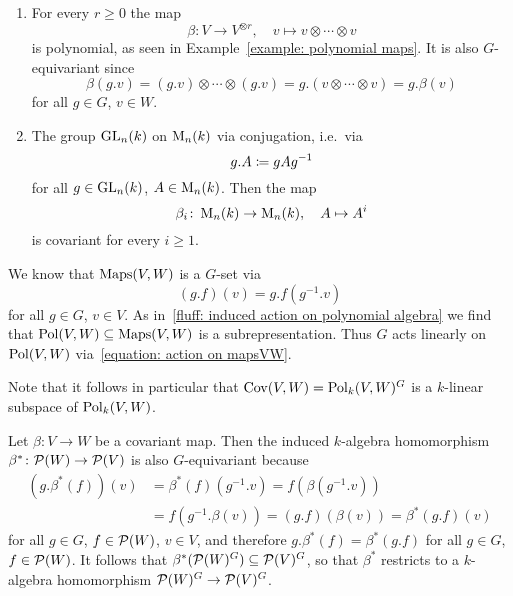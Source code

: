 \begin{example}
  \leavevmode
  \begin{enumerate}
    \item
      For every $r \geq 0$ the map
      \[
                \beta
        \colon  V \to V^{\otimes r},
        \quad   v
        \mapsto v \otimes \dotsb \otimes v
      \]
      is polynomial, as seen in Example~\ref{example: polynomial maps}.
      It is also $G$-equivariant since
      \[
          \beta(g.v)
        = (g.v) \otimes \dotsb \otimes (g.v)
        = g.(v \otimes \dotsb \otimes v)
        = g.\beta(v)
      \]
      for all $g \in G$, $v \in W$.
    \item
      The group $\operatorname{GL}_n(k)$ on $\operatorname{M}_n(k)$ via conjugation, i.e.\ via
      \[
                  g.A
        \coloneqq  gAg^{-1}
      \]
      for all $g \in \operatorname{GL}_n(k)$, $A \in \operatorname{M}_n(k)$.
      Then the map
      \[
                \beta_i 
        \colon  \operatorname{M}_n(k) 
        \to     \operatorname{M}_n(k),
        \quad   A
        \mapsto A^i
      \]
      is covariant for every $i \geq 1$. 
  \end{enumerate}
\end{example}


\begin{fluff}
% 
% 
  We know that $\operatorname{Maps}(V,W)$ is a $G$-set via
  \begin{equation}
    \label{equation: action on mapsVW}
      (g.f)(v)
    = g.f\left( g^{-1}.v \right)
  \end{equation}
  for all $g \in G$, $v \in V$.
  As in~\ref{fluff: induced action on polynomial algebra} we find that $\operatorname{Pol}(V,W) \subseteq \operatorname{Maps}(V,W)$ is a subrepresentation.
  Thus $G$ acts linearly on $\operatorname{Pol}(V,W)$ via~\eqref{equation: action on mapsVW}.
  
  Note that it follows in particular that $\operatorname{Cov}(V,W) = \operatorname{Pol}_k(V,W)^G$ is a $k$-linear subspace of $\operatorname{Pol}_k(V,W)$.
  
  Let $\beta \colon V \to W$ be a covariant map.
  Then the induced $k$-algebra homomorphism $\beta^* \colon \mathcal{P}(W) \to \mathcal{P}(V)$ is also $G$-equivariant because
  \begin{align*}
        (g.\beta^*(f))(v)
    &=  \beta^*(f)(g^{-1}.v)
     =  f(\beta(g^{-1}.v))  \\
    &=  f(g^{-1}.\beta(v))
     =  (g.f)(\beta(v))
     =  \beta^*(g.f)(v)
  \end{align*}
  for all $g \in G$, $f \in \mathcal{P}(W)$, $v \in V$, and therefore $g.\beta^*(f) = \beta^*(g.f)$ for all $g \in G$, $f \in \mathcal{P}(W)$.
  It follows that $\beta^*(\mathcal{P}(W)^G) \subseteq \mathcal{P}(V)^G$, so that $\beta^*$ restricts to a $k$-algebra homomorphism $\mathcal{P}(W)^G \to \mathcal{P}(V)^G$.
\end{fluff}


